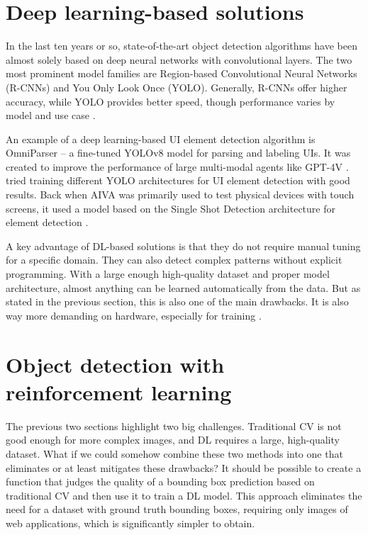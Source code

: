 \documentclass[
  digital,     %
  oneside,     %
  nosansbold,  %
  nocolorbold, %
  lof,         %
  lot,         %
]{fithesis4}
\begin{document}
\section{Deep learning-based solutions}
In the last ten years or so, state-of-the-art object detection algorithms have been almost solely based on deep neural networks with convolutional layers. The two most prominent model families are Region-based Convolutional Neural Networks (R-CNNs) and You Only Look Once (YOLO). Generally, R-CNNs offer higher accuracy, while YOLO provides better speed, though performance varies by model and use case \cite{ObjectDetectionHistorySurvey}.

An example of a deep learning-based UI element detection algorithm is OmniParser -- a fine-tuned YOLOv8 model for parsing and labeling UIs. It was created to improve the performance of large multi-modal agents like GPT-4V \cite{OmniParser}. \cite{GUI_YOLO_comparison} tried training different YOLO architectures for UI element detection with good results. Back when AIVA was primarily used to test physical devices with touch screens, it used a model based on the Single Shot Detection architecture for element detection \cite{Horak2020thesis}.

A key advantage of DL-based solutions is that they do not require manual tuning for a specific domain. They can also detect complex patterns without explicit programming. With a large enough high-quality dataset and proper model architecture, almost anything can be learned automatically from the data. But as stated in the previous section, this is also one of the main drawbacks. It is also way more demanding on hardware, especially for training \cite{DLvsTCV}.

\section{Object detection with reinforcement learning}

The previous two sections highlight two big challenges. Traditional CV is not good enough for more complex images, and DL requires a large, high-quality dataset. What if we could somehow combine these two methods into one that eliminates or at least mitigates these drawbacks? It should be possible to create a function that judges the quality of a bounding box prediction based on traditional CV and then use it to train a DL model. This approach eliminates the need for a dataset with ground truth bounding boxes, requiring only images of web applications, which is significantly simpler to obtain.
\end{document}
